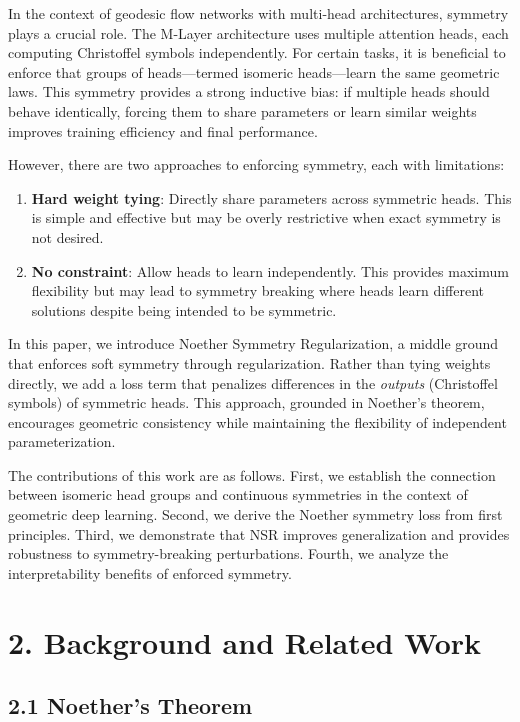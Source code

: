 \documentclass[12pt]{article}
\begin{document}
In the context of geodesic flow networks with multi-head architectures, symmetry plays a crucial role. The M-Layer architecture uses multiple attention heads, each computing Christoffel symbols independently. For certain tasks, it is beneficial to enforce that groups of heads—termed isomeric heads—learn the same geometric laws. This symmetry provides a strong inductive bias: if multiple heads should behave identically, forcing them to share parameters or learn similar weights improves training efficiency and final performance.

However, there are two approaches to enforcing symmetry, each with limitations:

\begin{enumerate}
\item \textbf{Hard weight tying}: Directly share parameters across symmetric heads. This is simple and effective but may be overly restrictive when exact symmetry is not desired.

\item \textbf{No constraint}: Allow heads to learn independently. This provides maximum flexibility but may lead to symmetry breaking where heads learn different solutions despite being intended to be symmetric.
\end{enumerate}

In this paper, we introduce Noether Symmetry Regularization, a middle ground that enforces soft symmetry through regularization. Rather than tying weights directly, we add a loss term that penalizes differences in the \textit{outputs} (Christoffel symbols) of symmetric heads. This approach, grounded in Noether's theorem, encourages geometric consistency while maintaining the flexibility of independent parameterization.

The contributions of this work are as follows. First, we establish the connection between isomeric head groups and continuous symmetries in the context of geometric deep learning. Second, we derive the Noether symmetry loss from first principles. Third, we demonstrate that NSR improves generalization and provides robustness to symmetry-breaking perturbations. Fourth, we analyze the interpretability benefits of enforced symmetry.

\section{2. Background and Related Work}

\subsection{2.1 Noether's Theorem}
\end{document}
